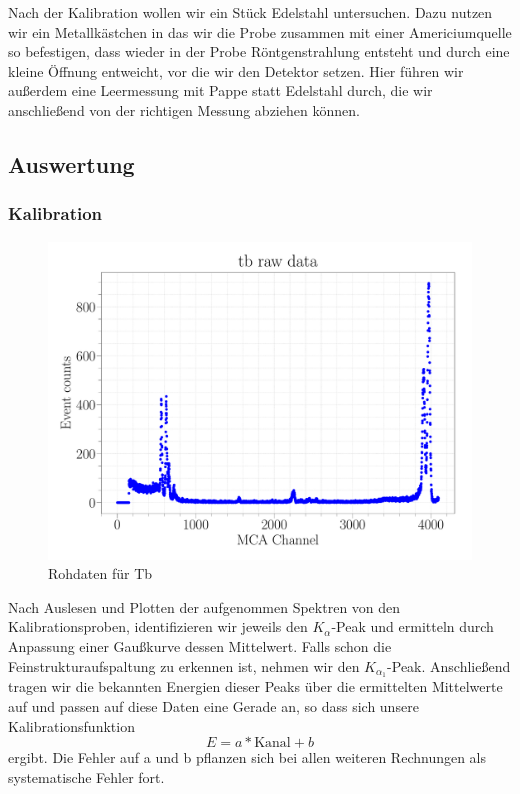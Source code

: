 \documentclass[a4paper,14pt]{article}
\begin{document}
Nach der Kalibration wollen wir ein Stück Edelstahl untersuchen. Dazu nutzen wir ein Metallkästchen in das wir die Probe zusammen mit einer Americiumquelle so befestigen, dass wieder in der Probe Röntgenstrahlung entsteht und durch eine kleine Öffnung entweicht, vor die wir den Detektor setzen. Hier führen wir außerdem eine Leermessung mit Pappe statt Edelstahl durch, die wir anschließend von der richtigen Messung abziehen können.

\subsection{Auswertung}
\subsubsection{Kalibration}

\begin{figure}[H]
\centering
\includegraphics[width=\textwidth]{../Figures/am_tb_raw.pdf}
\caption{Rohdaten für Tb}
\label{am_tb_raw}
\end{figure}

Nach Auslesen und Plotten der aufgenommen Spektren von den Kalibrationsproben, identifizieren wir jeweils den $K_\alpha$-Peak und ermitteln durch Anpassung einer Gaußkurve dessen Mittelwert. Falls schon die Feinstrukturaufspaltung zu erkennen ist, nehmen wir den $K_{\alpha_1}$-Peak. Anschließend tragen wir die bekannten Energien dieser Peaks über die ermittelten Mittelwerte auf und passen auf diese Daten eine Gerade an, so dass sich unsere Kalibrationsfunktion
\begin{equation}
	E = a * \mathrm{Kanal} + b
\end{equation}
ergibt. Die Fehler auf a und b pflanzen sich bei allen weiteren Rechnungen als systematische Fehler fort.
\end{document}
